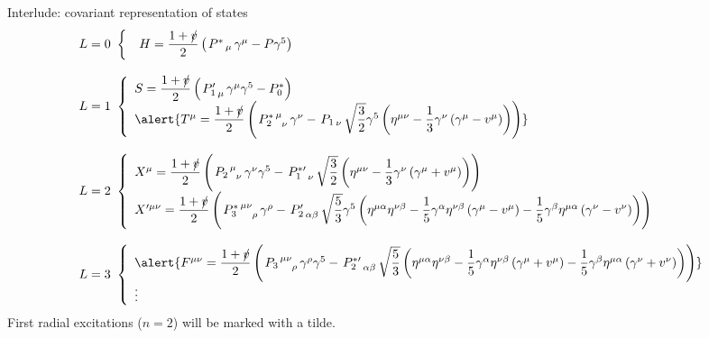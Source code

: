 \documentclass[professionalfonts,aspectratio=169]{beamer}
\begin{document}
\begin{frame}{Interlude: covariant representation of states}
  \scriptsize
  \begin{equation*}
    \begin{array}{l}
      L = 0 \ \left\{ \quad H =  \dfrac{1 + \slashed{v}}{2} \left( \left. P^* \right._\mu \gamma^\mu - P \gamma^5 \right) \right. \\ \\
      L = 1 \ \left\{
        \begin{array}{l}
          S = \dfrac{1 + \slashed{v}}{2} \left( \left. P^\prime_1 \right._\mu \gamma^\mu \gamma^5 - P^*_0 \right) \\
          \alert{T^\mu = \dfrac{1+\slashed{v}}{2} \left( \left. P^*_2 \right.\indices{^\mu_\nu} \gamma^\nu - \left. P_1 \right._\nu \sqrt{\dfrac{3}{2}} \gamma^5 \left( \eta^{\mu \nu} - \dfrac{1}{3} \gamma^\nu \left( \gamma^\mu - v^\mu \right) \right) \right)}
        \end{array} \right. \\ \\
     L = 2 \ \left\{
       \begin{array}{l}
          X^\mu = \dfrac{1+\slashed{v}}{2} \left( \left. P_2 \right.\indices{^\mu_\nu} \gamma^\nu \gamma^5 - \left. P^{* \prime}_1 \right._\nu \sqrt{\dfrac{3}{2}} \left( \eta^{\mu \nu} - \dfrac{1}{3} \gamma^\nu \left( \gamma^\mu + v^\mu \right) \right) \right) \\
          X^{\prime \mu \nu} = \dfrac{1 + \slashed{v}}{2} \left( \left. P^*_3 \right.\indices{^{\mu \nu}_\rho} \gamma^\rho - \left. P^\prime_2 \right. \indices{_{\alpha \beta}} \sqrt{\dfrac{5}{3}} \gamma^5 \left( \eta^{\mu \alpha} \eta^{\nu \beta} - \dfrac{1}{5} \gamma^\alpha \eta^{\nu \beta} \left( \gamma^\mu - v^\mu \right) - \dfrac{1}{5} \gamma^\beta \eta^{\mu \alpha} \left( \gamma^\nu - v^\nu \right) \right) \vphantom{\sqrt{\dfrac{5}{3}}} \! \right) 
      \end{array} \right. \\ \\
     L = 3 \ \left\{
       \begin{array}{l}
         \alert{F^{\mu \nu} = \dfrac{1 + \slashed{v}}{2} \left( \left. P_3 \right.\indices{^{\mu \nu}_\rho} \gamma^\rho \gamma^5 - \left. P^{* \prime}_2 \right.\indices{_{\alpha \beta}} \sqrt{\dfrac{5}{3}} \left( \eta^{\mu \alpha} \eta^{\nu \beta} - \dfrac{1}{5} \gamma^\alpha \eta^{\nu \beta} \left( \gamma^\mu + v^\mu \right) - \dfrac{1}{5} \gamma^\beta \eta^{\mu \alpha} \left( \gamma^\nu + v^\nu \right) \right) \right) } \\
          \vdots
        \end{array} \right.
    \end{array}
  \end{equation*}
  \normalsize
  First radial excitations ($n = 2$) will be marked with a tilde.
\end{frame}
\end{document}
